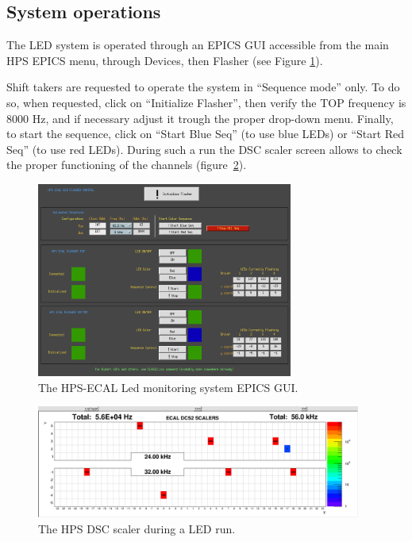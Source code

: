 \documentclass[12pt]{article}
\begin{document}
      \subsection{System operations}
      
      The LED system is operated through an EPICS GUI accessible from the main HPS EPICS menu, through Devices, then Flasher (see Figure \ref{FlasherMEDM}).

Shift takers are requested to operate the system in ``Sequence mode'' only. To do so, when requested, click on ``Initialize Flasher'', then verify the TOP frequency is 8000 Hz, and if necessary adjust it trough the proper drop-down menu. Finally, to start the sequence, click on ``Start Blue Seq'' (to use blue LEDs) or ``Start Red Seq'' (to use red LEDs). During such a run the DSC scaler screen allows to check the proper functioning of the channels (figure~\ref{LEDScalers}). 

\begin{figure}[htbp]
\center
\includegraphics[width=0.75\textwidth]{pics/FlasherMEDM.png}
\caption{\small \label{FlasherMEDM} The HPS-ECAL Led monitoring system EPICS GUI.}
\end{figure}
\begin{figure}[htbp]
\center
\includegraphics[width=0.95\textwidth]{pics/DSCScalersLED_2014_12_20.png}
\caption{\small \label{LEDScalers} The HPS DSC scaler during a LED run.}
\end{figure}
\newpage
\end{document}
